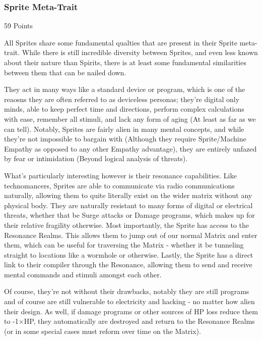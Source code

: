 \begin{multicols*}{3}
\subsubsection{Sprite Meta-Trait}
\begin{flushright}
	59 Points
\end{flushright}

All Sprites share some fundamental qualties that are present in their Sprite meta-trait. While there is still incredible diversity between Sprites, and even less known about their nature than Spirits, there is at least some fundamental similarities between them that can be nailed down.

They act in many ways like a standard device or program, which is one of the reaosns they are often referred to as deviceless personas; they're digital only minds, able to keep perfect time and directions, perform complex calculations with ease, remember all stimuli, and lack any form of aging (At least as far as we can tell). Notably, Sprites are fairly alien in many mental concepts, and while they're not impossible to bargain with (Although they require Sprite/Machine Empathy as opposed to any other Empathy advantage), they are entirely unfazed by fear or intimidation (Beyond logical analysis of threats).

What's particularly interesting however is their resonance capabilities. Like technomancers, Sprites are able to communicate via radio communications naturally, allowing them to quite literally exist on the wider matrix without any physical body. They are naturally resistant to many forms of digital or electrical threats, whether that be Surge attacks or Damage programs, which makes up for their relative fragility otherwise. Most importantly, the Sprite has access to the Resonance Realms. This allows them to jump out of our normal Matrix and enter them,  which can be useful for traversing the Matrix - whether it be tunneling straight to locations like a wormhole or otherwise. Lastly, the Sprite has a direct link to their compiler through the Resonance, allowing them to send and receive mental commands and stimuli amongst each other.

Of course, they're not without their drawbacks, notably they are still programs and of course are still vulnerable to electricity and hacking - no matter how alien their design. As well, if damage programs or other sources of HP loss reduce them to -1$\times$HP, they automatically are destroyed and return to the Resonance Realms (or in some special cases must reform over time on the Matrix).


\end{multicols*}
